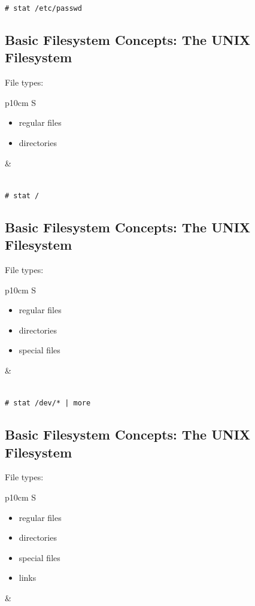 \documentclass[xga]{xdvislides}
\begin{document}
\verb+# stat /etc/passwd+


\subsection{Basic Filesystem Concepts: The UNIX Filesystem}
File types:
\\

\begin{tabular}{ p{10cm} S }
\begin{itemize}
	\item regular files
	\item directories
\end{itemize}
&  \\
\end{tabular}
\\

\verb+# stat /+

\subsection{Basic Filesystem Concepts: The UNIX Filesystem}
File types:
\\

\begin{tabular}{ p{10cm} S }
\begin{itemize}
	\item regular files
	\item directories
	\item special files
\end{itemize}
&  \\
\end{tabular}
\\

\verb+# stat /dev/* | more+

\subsection{Basic Filesystem Concepts: The UNIX Filesystem}
File types:
\\

\begin{tabular}{ p{10cm} S }
\begin{itemize}
	\item regular files
	\item directories
	\item special files
	\item links
\end{itemize}
&  \\
\end{tabular}
\\
\end{document}
